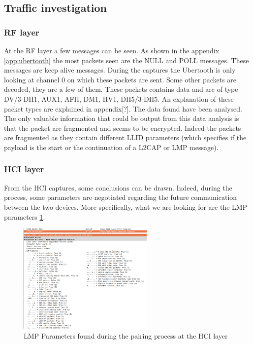 \subsection{Traffic investigation}
\subsubsection{RF layer}
At the RF layer a few messages can be seen. As shown in the appendix \ref{app:ubertooth} the most packets seen are the NULL and POLL messages. These messages are keep alive messages. During the captures the Ubertooth is only looking at channel 0 on which these packets are sent.
Some other packets are decoded, they are a few of them. These packets contains data and are of type DV/3-DH1, AUX1, AFH, DM1, HV1, DH5/3-DH5. An explanation of these packet types are explained in appendix[?]. The data found have been analysed. The only valuable information that could be output from this data analysis is that the packet are fragmented and seems to be encrypted. Indeed the packets are fragmented as they contain different LLID parameters (which specifies if the payload is the start or the continuation of a L2CAP or LMP message).

\subsubsection{HCI layer}
From the HCI captures, some conclusions can be drawn. Indeed, during the process, some parameters are negotiated regarding the future communication between the two devices. More specifically, what we are looking for are the LMP parameters \ref{fig:lmp}. 

\begin{figure}[!h]
  \begin{center}
	\includegraphics[width=250px]{images/LMP_PARAM.png}
  \end{center}
  \label{fig:lmp}
  \caption{LMP Parameters found during the pairing process at the HCI layer}
\end{figure}

